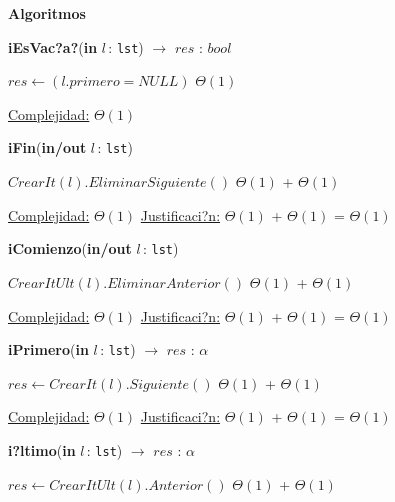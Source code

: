 \documentclass[a4paper,10pt]{article}
\let\TipoVariable=\texttt
\let\ModificadorArgumento=\textbf
\newcommand{\In}[2]{\ModificadorArgumento{in} \ensuremath{#1}\,: \TipoVariable{#2}\xspace}
\newcommand{\Inout}[2]{\ModificadorArgumento{in/out} \ensuremath{#1}\,: \TipoVariable{#2}\xspace}
\newenvironment{Algoritmos}{%
  \vspace*{2ex}%
  \noindent\textbf{\Large Algoritmos}%
  \vspace*{2ex}%
}{}
\begin{document}
\begin{Algoritmos}
\begin{algorithm}[H]{\textbf{iEsVac?a?}(\In{l}{lst}) $\to$ $res$ : $bool$}
	\begin{algorithmic}[1]
			 \State $res \gets (l.primero = NULL)$	 \Comment $\Theta(1)$
    
			\medskip
			\Statex \underline{Complejidad:} $\Theta(1)$
    	\end{algorithmic}
\end{algorithm}	


\begin{algorithm}[H]{\textbf{iFin}(\Inout{l}{lst})}
	\begin{algorithmic}[1]
			 \State $CrearIt(l).EliminarSiguiente()$	\Comment $\Theta(1)$ + $\Theta(1)$
			 
			\medskip
			\Statex \underline{Complejidad:} $\Theta(1)$
			\Statex \underline{Justificaci?n:} $\Theta(1)$ + $\Theta(1)$ = $\Theta(1)$
    	\end{algorithmic}
\end{algorithm}	

	
\begin{algorithm}[H]{\textbf{iComienzo}(\Inout{l}{lst})}	
	\begin{algorithmic}[1]
			 \State $CrearItUlt(l).EliminarAnterior()$	\Comment $\Theta(1)$ + $\Theta(1)$
    	    
			\medskip
			\Statex \underline{Complejidad:} $\Theta(1)$
			\Statex \underline{Justificaci?n:} $\Theta(1)$ + $\Theta(1)$ = $\Theta(1)$
			 
    	\end{algorithmic}
\end{algorithm}	
	
\begin{algorithm}[H]{\textbf{iPrimero}(\In{l}{lst}) $\to$ $res$ : $\alpha$}	
	\begin{algorithmic}[1]
		 \State $res \gets CrearIt(l).Siguiente()$	\Comment $\Theta(1)$ + $\Theta(1)$

		\medskip
		\Statex \underline{Complejidad:} $\Theta(1)$
		\Statex \underline{Justificaci?n:} $\Theta(1)$ + $\Theta(1)$ = $\Theta(1)$
    \end{algorithmic}
\end{algorithm}	
	
\begin{algorithm}[H]{\textbf{i?ltimo}(\In{l}{lst}) $\to$ $res$ : $\alpha$}	
	\begin{algorithmic}[1]
			 \State $res \gets CrearItUlt(l).Anterior()$	\Comment $\Theta(1)$ + $\Theta(1)$
    	    	    

\end{algorithmic}
\end{algorithm}
\end{Algoritmos}
\end{document}
